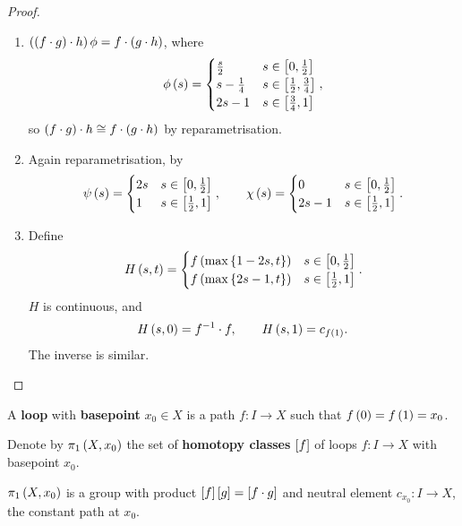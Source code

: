 \begin{proof}
\hfill
\begin{enumerate}
\item $ \rb{\rb{f \cdot g} \cdot h}\phi = f \cdot \rb{g \cdot h} $, where
$$ \phi\rb{s} =
\begin{cases}
\tfrac{s}{2} & s \in \sb{0, \tfrac{1}{2}} \\
s - \tfrac{1}{4} & s \in \sb{\tfrac{1}{2}, \tfrac{3}{4}} \\
2s - 1 & s \in \sb{\tfrac{3}{4}, 1}
\end{cases},
$$
so $ \rb{f \cdot g} \cdot h \cong f \cdot \rb{g \cdot h} $ by reparametrisation.
\item Again reparametrisation, by
$$ \psi\rb{s} =
\begin{cases}
2s & s \in \sb{0, \tfrac{1}{2}} \\
1 & s \in \sb{\tfrac{1}{2}, 1}
\end{cases},
\qquad \chi\rb{s} =
\begin{cases}
0 & s \in \sb{0, \tfrac{1}{2}} \\
2s - 1 & s \in \sb{\tfrac{1}{2}, 1}
\end{cases}.
$$
\item Define
$$ H\rb{s, t} =
\begin{cases}
f\rb{\max\cb{1 - 2s, t}} & s \in \sb{0, \tfrac{1}{2}} \\
f\rb{\max\cb{2s - 1, t}} & s \in \sb{\tfrac{1}{2}, 1}
\end{cases}.
$$
$ H $ is continuous, and
$$ H\rb{s, 0} = f^{-1} \cdot f, \qquad H\rb{s, 1} = c_{f\rb{1}}. $$
The inverse is similar.
\end{enumerate}
\end{proof}

\pagebreak

\begin{definition*}
A \textbf{loop} with \textbf{basepoint} $ x_0 \in X $ is a path $ f : I \to X $ such that $ f\rb{0} = f\rb{1} = x_0 $.
\end{definition*}

\begin{definition*}
Denote by $ \pi_1\rb{X, x_0} $ the set of \textbf{homotopy classes} $ \sb{f} $ of loops $ f : I \to X $ with basepoint $ x_0 $.
\end{definition*}

\begin{proposition}
$ \pi_1\rb{X, x_0} $ is a group with product $ \sb{f}\sb{g} = \sb{f \cdot g} $ and neutral element $ c_{x_0} : I \to X $, the constant path at $ x_0 $.
\end{proposition}

